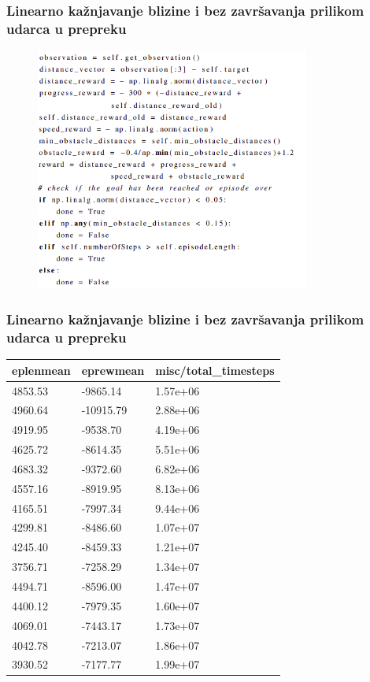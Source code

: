\documentclass{beamer}
\begin{document}
\begin{frame}
	\frametitle{Linearno kažnjavanje blizine i bez završavanja prilikom udarca u prepreku}

	\begin{figure}[h!]
		\centering
		\includegraphics[height=8cm]{img/bes.png}
	\end{figure}

\end{frame}

\begin{frame}
	\frametitle{Linearno kažnjavanje blizine i bez završavanja prilikom udarca u prepreku}

	\begin{table}[ht!]
		\centering
		\label{tab:rub}
		\begin{tabular}{@{}lll@{}}
			\hline
			eplenmean & eprewmean & misc/total\_timesteps \\
			\hline
			\hline
			4853.53   & -9865.14  & 1.57e+06              \\
			4960.64   & -10915.79 & 2.88e+06              \\
			4919.95   & -9538.70  & 4.19e+06              \\
			4625.72   & -8614.35  & 5.51e+06              \\
			4683.32   & -9372.60  & 6.82e+06              \\
			4557.16   & -8919.95  & 8.13e+06              \\
			4165.51   & -7997.34  & 9.44e+06              \\
			4299.81   & -8486.60  & 1.07e+07              \\
			4245.40   & -8459.33  & 1.21e+07              \\
			3756.71   & -7258.29  & 1.34e+07              \\
			4494.71   & -8596.00  & 1.47e+07              \\
			4400.12   & -7979.35  & 1.60e+07              \\
			4069.01   & -7443.17  & 1.73e+07              \\
			4042.78   & -7213.07  & 1.86e+07              \\
			3930.52   & -7177.77  & 1.99e+07              \\
			\hline
		\end{tabular}
	\end{table}

\end{frame}
\end{document}
